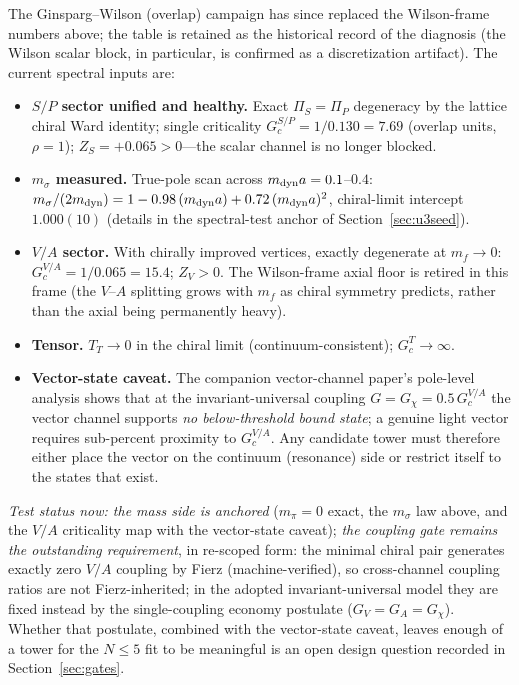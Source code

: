 \documentclass[11pt,a4paper]{article}
\begin{document}
The Ginsparg--Wilson (overlap) campaign has since replaced the
Wilson-frame numbers above; the table is retained as the
historical record of the diagnosis (the Wilson scalar block, in
particular, is confirmed as a discretization artifact).  The
current spectral inputs are:
\begin{itemize}
\item \textbf{$S/P$ sector unified and healthy.}  Exact
$\Pi_S = \Pi_P$ degeneracy by the lattice chiral Ward identity;
single criticality $G_c^{S/P} = 1/0.130 = 7.69$ (overlap units,
$\rho = 1$); $Z_S = +0.065 > 0$---the scalar channel is no longer
blocked.
\item \textbf{$m_\sigma$ measured.}  True-pole scan across
$m_{\rm dyn} a = 0.1$--$0.4$:
$m_\sigma/(2m_{\rm dyn}) = 1 - 0.98\,(m_{\rm dyn}a)
+ 0.72\,(m_{\rm dyn}a)^2$, chiral-limit intercept $1.000(10)$
(details in the spectral-test anchor of
Section~\ref{sec:u3seed}).
\item \textbf{$V/A$ sector.}  With chirally improved vertices,
exactly degenerate at $m_f \to 0$: $G_c^{V/A} = 1/0.065 = 15.4$;
$Z_V > 0$.  The Wilson-frame axial floor is retired in this frame
(the $V$--$A$ splitting grows with $m_f$ as chiral symmetry
predicts, rather than the axial being permanently heavy).
\item \textbf{Tensor.}  $T_T \to 0$ in the chiral limit
(continuum-consistent); $G_c^T \to \infty$.
\item \textbf{Vector-state caveat.}  The companion vector-channel
paper's pole-level analysis shows that at the invariant-universal
coupling $G = G_\chi = 0.5\,G_c^{V/A}$ the vector channel supports
\emph{no below-threshold bound state}; a genuine light vector
requires sub-percent proximity to $G_c^{V/A}$.  Any candidate
tower must therefore either place the vector on the continuum
(resonance) side or restrict itself to the states that exist.
\end{itemize}
\emph{Test status now: the mass side is anchored}
($m_\pi = 0$ exact, the $m_\sigma$ law above, and the $V/A$
criticality map with the vector-state caveat); \emph{the coupling
gate remains the outstanding requirement}, in re-scoped form: the
minimal chiral pair generates exactly zero $V/A$ coupling by Fierz
(machine-verified), so cross-channel coupling ratios are not
Fierz-inherited; in the adopted invariant-universal model they are
fixed instead by the single-coupling economy postulate
($G_V = G_A = G_\chi$).  Whether that postulate, combined with the
vector-state caveat, leaves enough of a tower for the $N \le 5$
fit to be meaningful is an open design question recorded in
Section~\ref{sec:gates}.
\end{document}
